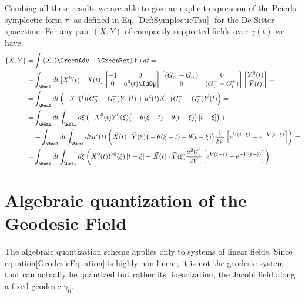 \documentclass[Main]{subfiles}
\begin{document}
			Combing all these results we are able to give an explicit expression of the Peierls symplectic form $\tau$- as defined in Eq. 	\ref{Def:SymplecticTau}- for the De Sitter spacetime.
			For any pair $(X, Y)$ of compactly supported fields over $\gamma(t)$ we have:
			\begin{align*}
			\{X ,Y \} =&\int \left\langle X, \left(\GreenAdv - \GreenRet \right)Y \right\rangle dt =	\\
			=&
			\int_\Real dt  
				 \begin{bmatrix}  
					 X^0(t) & \vec{X}(t) \\
				 \end{bmatrix}
				 \begin{bmatrix}  
				 	-1 & 0 \\
				 	0 & a^2(t)\IdOp
				 \end{bmatrix}			
				 \begin{bmatrix}  
				 	(G^-_0 - G^+_0) & 0 \\
				 	0 & (G^-_i - G^+_i)
				 \end{bmatrix}	
				 \begin{bmatrix}  
				 	Y^0(t) \\ \vec{Y}(t)
				 \end{bmatrix}	
				 = \\
			=&
				\int_\Real dt  \left(
					-X^0(t) (G^-_0 - G^+_0)Y^0(t)+
					a^2(t)\vec{X} \cdot (G^-_i- G^+_i)\vec{Y}(t)
				\right) = \\
			=&
				\int_\Real dt 				\int_\Real d\xi \left(
					-X^0(t)Y^0(\xi)\big(-\theta(\xi -t)-\theta(t-\xi )\big)\left[t-\xi \right] \right) +\\
			&+
					\int_\Real dt 				\int_\Real d\xi a^2(t) \left(
					\vec{X}(t) \cdot \vec{Y}(\xi)
						\big(-\theta(\xi -t)-\theta(t-\xi )\big) \frac{1}{2V}\left[ e^{V(t-\xi)} - e^{-V(t-\xi)}\right]
					\right) = \\
			=& \int_\Real dt 				\int_\Real d\xi \left(
				X^0(t)Y^0(\xi)\left[t-\xi \right]				-
				\vec{X}(t) \cdot \vec{Y}(\xi) \frac{a^2(t)}{2V}\left[ e^{V(t-\xi)} - e^{-V(t-\xi)}\right]
				\right)
			\end{align*}					
		

\section{Algebraic quantization of the Geodesic Field}
	The algebraic quantization scheme applies only to %
	systems of linear fields.
	Since equation\ref{GeodesicEquation} is highly non linear,  it is not the geodesic system that can actually be quantized but rather its linearization, the Jacobi field along a fixed geodesic $\gamma_0$.
	
\end{document}
